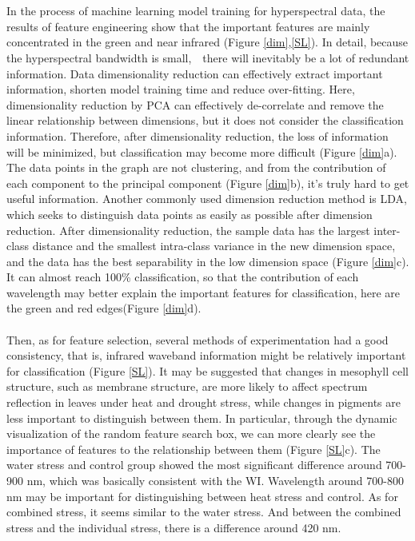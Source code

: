 \documentclass[12pt,a4paper]{article}
\begin{document}
\\
\\
In the process of machine learning model training for hyperspectral data, the results of feature engineering show that the important features are mainly concentrated in the green and near infrared (Figure \ref{dim},\ref{SL}).  In detail, because the hyperspectral bandwidth is small,　there will inevitably be a lot of redundant information. Data dimensionality reduction can effectively extract important information, shorten model training time and reduce over-fitting. Here, dimensionality reduction by PCA can effectively de-correlate and remove the linear relationship between dimensions, but it does not consider the classification information. Therefore, after dimensionality reduction, the loss of information will be minimized, but classification may become more difficult (Figure \ref{dim}a). The data points in the graph are not clustering, and from the contribution of each component to the principal component (Figure \ref{dim}b), it's truly hard to get useful information. Another commonly used dimension reduction method is LDA, which seeks to distinguish data points as easily as possible after dimension reduction. After dimensionality reduction, the sample data has the largest inter-class distance and the smallest intra-class variance in the new dimension space, and the data has the best separability in the low dimension space (Figure \ref{dim}c). It can almost reach 100\% classification, so that the contribution of each wavelength may better explain the important features for classification, here are the green and red edges(Figure \ref{dim}d).
\\
\\
Then, as for feature selection, several methods of experimentation had a good consistency, that is, infrared waveband information might be relatively important for classification (Figure \ref{SL}). It may be suggested that changes in mesophyll cell structure, such as membrane structure, are more likely to affect spectrum reflection in leaves under heat and drought stress, while changes in pigments are less important to distinguish between them. In particular, through the dynamic visualization of the random feature search box, we can more clearly see the importance of features to the relationship between them (Figure \ref{SL}c). The water stress and control group showed the most significant difference around 700-900 nm, which was basically consistent with the WI. Wavelength around 700-800 nm may be important for distinguishing between heat stress and control. As for combined stress, it seems similar to the water stress. And between the combined stress and the individual stress, there is a difference around 420 nm.
\end{document}
